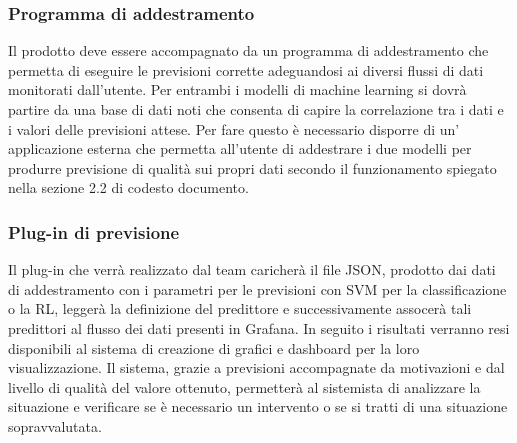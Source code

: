 \documentclass[../analisi-dei-requisiti.tex]{subfiles}
\begin{document}
	\subsubsection{Programma di addestramento}
	\label{sssec:programma_di_addestramento}
		Il prodotto deve essere accompagnato da un programma di addestramento che permetta di eseguire le previsioni corrette adeguandosi ai diversi flussi di dati monitorati dall'utente. Per entrambi i modelli di machine learning si dovrà partire da una base di dati noti che consenta di capire la correlazione tra i dati e i valori delle previsioni attese. Per fare questo è necessario disporre di un' applicazione esterna che permetta all'utente di addestrare i due modelli per produrre previsione di qualità sui propri dati secondo il funzionamento spiegato nella sezione 2.2 di codesto documento.

	\subsubsection{Plug-in di previsione}
	\label{sssec:plug-in_di_previsione}
		Il plug-in che verrà realizzato dal team caricherà il file JSON, prodotto dai dati di addestramento con i parametri per le previsioni con SVM per la classificazione o la RL, leggerà la definizione del predittore e successivamente assocerà tali predittori al flusso dei dati presenti in Grafana. In seguito i risultati verranno resi disponibili al sistema di creazione di grafici e dashboard per la loro visualizzazione. Il sistema, grazie a previsioni accompagnate da motivazioni e dal livello di qualità del valore ottenuto, permetterà al sistemista di analizzare la situazione e verificare se è necessario un intervento o se si tratti di una situazione sopravvalutata.
\end{document}
